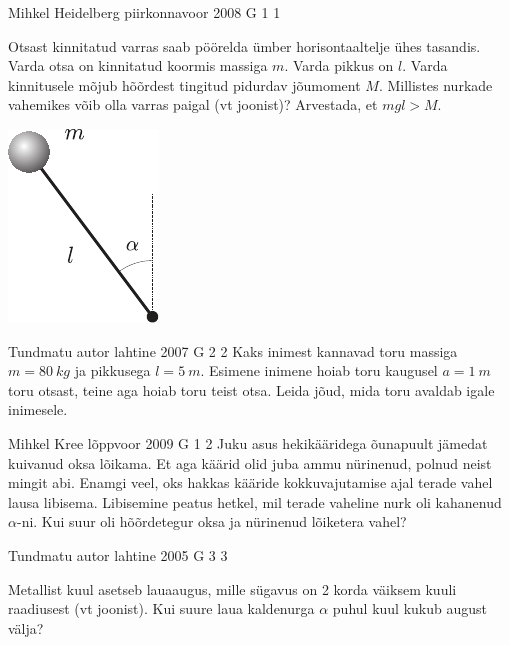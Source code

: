 \documentclass[11pt]{article}
\begin{document}
{%
{Mihkel Heidelberg} %
{piirkonnavoor} %
{2008} %
{G 1} %
{1} %
{
\ifStatement
Otsast kinnitatud varras saab pöörelda ümber horisontaaltelje ühes tasandis. Varda otsa on kinnitatud koormis massiga $m$. Varda pikkus on $l$. Varda kinnitusele mõjub hõõrdest tingitud pidurdav jõumoment $M$. Millistes nurkade vahemikes võib olla varras paigal (vt joonist)? Arvestada, et $mgl > M$.
\begin{center}
	\includegraphics[width=0.3\linewidth]{2008-v2g-01-yl}
\end{center}
\fi
}

{Tundmatu autor} %
{lahtine} %
{2007} %
{G 2} %
{2} %
{
\ifStatement
Kaks inimest kannavad toru massiga $m = \SI{80}{kg}$ ja pikkusega $l = \SI{5}{m}$. Esimene inimene hoiab toru kaugusel $a = \SI{1}{m}$ toru otsast, teine aga hoiab toru teist otsa. Leida jõud, mida toru avaldab igale inimesele.
\fi
}

{Mihkel Kree} %
{lõppvoor} %
{2009} %
{G 1} %
{2} %
{
\ifStatement
Juku asus hekikääridega õunapuult jämedat kuivanud oksa lõikama. Et aga käärid olid juba ammu nürinenud, polnud neist mingit abi. Enamgi veel, oks hakkas kääride kokkuvajutamise ajal terade vahel lausa libisema. Libisemine peatus hetkel, mil terade vaheline nurk oli kahanenud $\alpha$-ni. Kui suur oli hõõrdetegur oksa ja nürinenud lõiketera vahel?
\fi
}

{Tundmatu autor} %
{lahtine} %
{2005} %
{G 3} %
{3} %
{
\ifStatement
Metallist kuul asetseb lauaaugus, mille sügavus on 2 korda väiksem kuuli raadiusest (vt joonist). Kui suure laua kaldenurga $\alpha$ puhul kuul kukub august välja? 

}}
\end{document}
